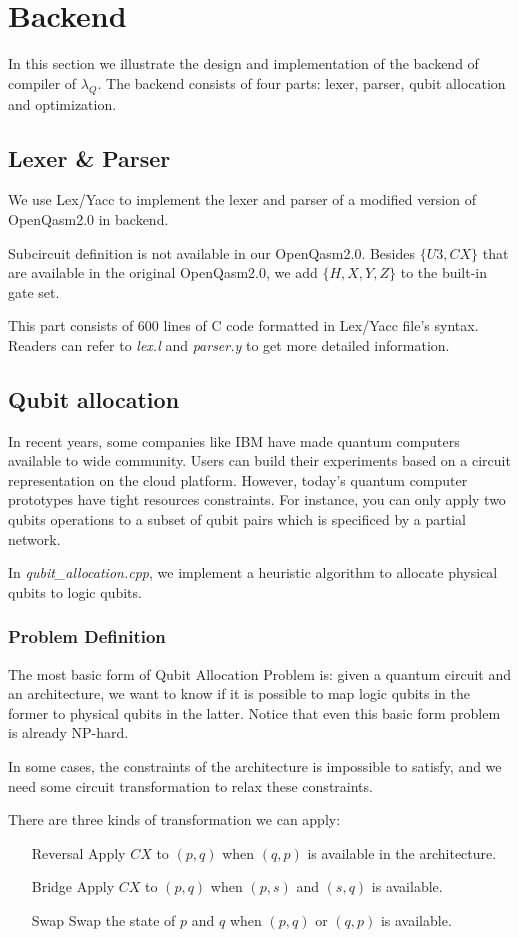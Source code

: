 \section{Backend} \label{back}
In this section we illustrate the design and implementation of the backend of compiler of $\lambda_Q$.
The backend consists of four parts: lexer, parser, qubit allocation and optimization.
\subsection{Lexer \& Parser}
We use Lex/Yacc to implement the lexer and parser of a modified version of OpenQasm2.0 in backend.

Subcircuit definition is not available in our OpenQasm2.0. Besides $\{U3,CX\}$ that are available in the original OpenQasm2.0, we add $\{H,X,Y,Z\}$ to the built-in gate set.

This part consists of 600 lines of C code formatted in Lex/Yacc file's syntax.
Readers can refer to \textit{lex.l} and \textit{parser.y} to get more detailed information.

\subsection{Qubit allocation}
In recent years, some companies like IBM have made quantum computers available to wide community.
Users can build their experiments based on a circuit representation on the cloud platform. However, today's quantum computer prototypes have tight resources constraints.
For instance, you can only apply two qubits operations to a subset of qubit pairs which is specificed by a partial network.

In \textit{qubit\_allocation.cpp}, we implement a heuristic algorithm  to allocate physical qubits to logic qubits.

\subsubsection{Problem Definition}
The most basic form of Qubit Allocation Problem is: given a quantum circuit and an architecture, we want to know if it is possible to map logic qubits in the former to physical qubits in the latter.
Notice that even this basic form problem is already NP-hard.

In some cases, the constraints of the architecture is impossible to satisfy, and we need some circuit transformation to relax these constraints.

There are three kinds of transformation we can apply:
\begin{itemize}
    \item[Reversal] Apply $CX$ to $(p,q)$ when $(q,p)$ is available in the architecture.
    \item[Bridge] Apply $CX$ to $(p,q)$ when $(p,s)$ and $(s, q)$ is available.
    \item[Swap] Swap the state of $p$ and $q$ when $(p,q)$ or $(q,p)$ is available.
\end{itemize}

